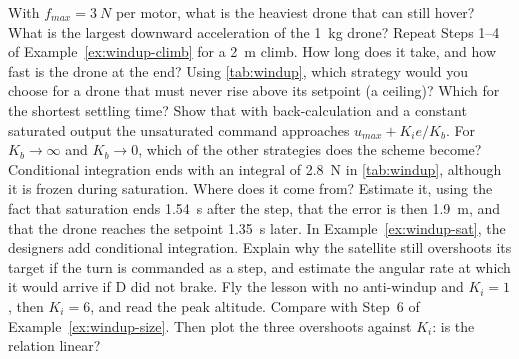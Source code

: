 \begin{exercises}
\exercise[1] With $f_{max} = \SI{3}{N}$ per motor, what is the heaviest drone that can still hover? What is the largest downward acceleration of the \SI{1}{kg} drone?
\exercise[1] Repeat Steps 1–4 of Example~\ref{ex:windup-climb} for a \SI{2}{m} climb. How long does it take, and how fast is the drone at the end?
\exercise[1] Using \cref{tab:windup}, which strategy would you choose for a drone that must never rise above its setpoint (a ceiling)? Which for the shortest settling time?
\exercise[2] Show that with back-calculation and a constant saturated output the unsaturated command approaches $u_{max} + K_i e/K_b$. For $K_b \to \infty$ and $K_b \to 0$, which of the other strategies does the scheme become?
\exercise[2] Conditional integration ends with an integral of \SI{2.8}{N} in \cref{tab:windup}, although it is frozen during saturation. Where does it come from? Estimate it, using the fact that saturation ends \SI{1.54}{s} after the step, that the error is then \SI{1.9}{m}, and that the drone reaches the setpoint \SI{1.35}{s} later.
\exercise[2] In Example~\ref{ex:windup-sat}, the designers add conditional integration. Explain why the satellite still overshoots its target if the turn is commanded as a step, and estimate the angular rate at which it would arrive if D did not brake.
\exercise[2] Fly the lesson with no anti-windup and $K_i = 1$, then $K_i = 6$, and read the peak altitude. Compare with Step~6 of Example~\ref{ex:windup-size}. Then plot the three overshoots against $K_i$: is the relation linear?

\end{exercises}
